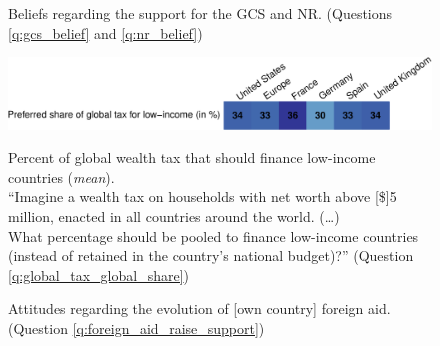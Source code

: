\begin{bibunit}
\begin{figure}[h!]
  \caption[Beliefs about support for the GCS and NR]{Beliefs regarding the support for the GCS and NR. (Questions \ref{q:gcs_belief} and \ref{q:nr_belief})}\label{fig:belief}
\end{figure}

\begin{figure}
  \centering 
  \caption[Preferred share of wealth tax for low-income countries]{Percent of global wealth tax that should finance low-income countries (\textit{mean}). \\ ``Imagine a wealth tax on households with net worth above [\$]5 million, enacted in all countries around the world.  
  (\dots)  \\
  What percentage should be pooled to finance low-income countries (instead of retained in the country's national budget)?'' (Question \ref{q:global_tax_global_share})} %
  \includegraphics[width=1\textwidth]{../figures/country_comparison/global_tax_global_share_mean.pdf} \label{fig:global_share_mean}
\end{figure}

\begin{figure}[h!]
  \caption[Attitudes on the evolution of foreign aid]{Attitudes regarding the evolution of [own country] foreign aid. (Question \ref{q:foreign_aid_raise_support})}\label{fig:foreign_aid_raise_support}
\end{figure}


\end{bibunit}
